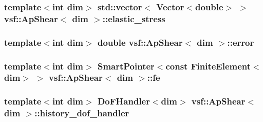 \hypertarget{classvsf_1_1ApShear_a33a3a15c5d8d4f808dbb7e7e26154048}{
\subsubsection[{elastic\-\_\-stress}]{\setlength{\rightskip}{0pt plus 5cm}template$<$int dim$>$ std\-::vector$<$ Vector$<$double$>$ $>$ {\bf vsf\-::\-Ap\-Shear}$<$ dim $>$\-::elastic\-\_\-stress\hspace{0.3cm}{\ttfamily [private]}}}\label{classvsf_1_1ApShear_a33a3a15c5d8d4f808dbb7e7e26154048}
\hypertarget{classvsf_1_1ApShear_a980e61d73be5cae2b8e8498b9ffc087a}{
\subsubsection[{error}]{\setlength{\rightskip}{0pt plus 5cm}template$<$int dim$>$ double {\bf vsf\-::\-Ap\-Shear}$<$ dim $>$\-::error\hspace{0.3cm}{\ttfamily [private]}}}\label{classvsf_1_1ApShear_a980e61d73be5cae2b8e8498b9ffc087a}
\hypertarget{classvsf_1_1ApShear_a228388a897a688b79d0800f3bb18697f}{
\subsubsection[{fe}]{\setlength{\rightskip}{0pt plus 5cm}template$<$int dim$>$ Smart\-Pointer$<$const Finite\-Element$<$dim$>$ $>$ {\bf vsf\-::\-Ap\-Shear}$<$ dim $>$\-::fe\hspace{0.3cm}{\ttfamily [private]}}}\label{classvsf_1_1ApShear_a228388a897a688b79d0800f3bb18697f}
\hypertarget{classvsf_1_1ApShear_acdcfb9ec77c56722ce42173f7599c336}{
\subsubsection[{history\-\_\-dof\-\_\-handler}]{\setlength{\rightskip}{0pt plus 5cm}template$<$int dim$>$ Do\-F\-Handler$<$dim$>$ {\bf vsf\-::\-Ap\-Shear}$<$ dim $>$\-::history\-\_\-dof\-\_\-handler\hspace{0.3cm}{\ttfamily [private]}}}\label{classvsf_1_1ApShear_acdcfb9ec77c56722ce42173f7599c336}
